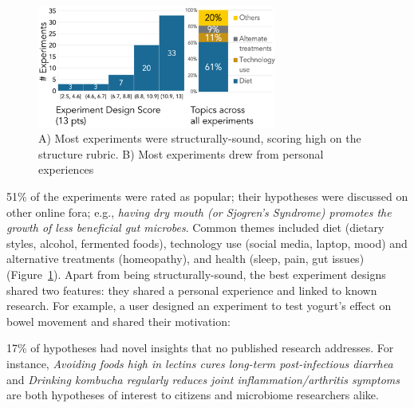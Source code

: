 \begin{figure}[h]
\centering
  \includegraphics[width=0.7\textwidth]{figures/galileo/galileo-study2-1}
  \caption[Results: Most experiments were structurally-sound and drew from personal experiences]
{A) Most experiments were structurally-sound, scoring high on the structure rubric. B) Most experiments drew from personal experiences }
  \label{fig:galileo-8-result}
\end{figure}

51\% of the experiments were rated as popular; their hypotheses were discussed on other online fora; e.g., \textit{having dry mouth (or Sjogren's Syndrome) promotes the growth of less beneficial gut microbes}. Common themes included diet (dietary styles, alcohol, fermented foods), technology use (social media, laptop, mood) and alternative treatments (homeopathy), and health (sleep, pain, gut issues) (Figure~\ref{fig:galileo-8-result}). Apart from being structurally-sound, the best experiment designs shared two features: they shared a personal experience and linked to known research. For example, a user designed an experiment to test yogurt's effect on bowel movement and shared their motivation: 

\textit{}

17\% of hypotheses had novel insights that no published research addresses. For instance, \textit{Avoiding foods high in lectins cures long-term post-infectious diarrhea} and \textit{Drinking kombucha regularly reduces joint inflammation/arthritis symptoms} are both hypotheses of interest to citizens and microbiome researchers alike.

